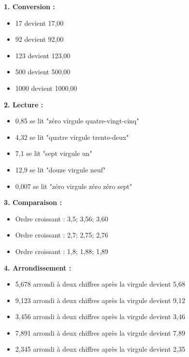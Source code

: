 \documentclass{article}
\begin{document}
\begin{tcolorbox}[colback=green!10!white, colframe=green!75!black, sharp corners=south, boxrule=0.8mm, title=Corrections]
    \textbf{1. Conversion :}
    \begin{itemize}
        \item 17 devient 17,00
        \item 92 devient 92,00
        \item 123 devient 123,00
        \item 500 devient 500,00
        \item 1000 devient 1000,00
    \end{itemize}

    \textbf{2. Lecture :}
    \begin{itemize}
        \item 0,85 se lit "zéro virgule quatre-vingt-cinq"
        \item 4,32 se lit "quatre virgule trente-deux"
        \item 7,1 se lit "sept virgule un"
        \item 12,9 se lit "douze virgule neuf"
        \item 0,007 se lit "zéro virgule zéro zéro sept"
    \end{itemize}

    \textbf{3. Comparaison :}
    \begin{itemize}
        \item Ordre croissant : 3,5; 3,56; 3,60
        \item Ordre croissant : 2,7; 2,75; 2,76
        \item Ordre croissant : 1,8; 1,88; 1,89
    \end{itemize}

    \textbf{4. Arrondissement :}
    \begin{itemize}
        \item 5,678 arrondi à deux chiffres après la virgule devient 5,68
        \item 9,123 arrondi à deux chiffres après la virgule devient 9,12
        \item 3,456 arrondi à deux chiffres après la virgule devient 3,46
        \item 7,891 arrondi à deux chiffres après la virgule devient 7,89
        \item 2,345 arrondi à deux chiffres après la virgule devient 2,35
    \end{itemize}


\end{tcolorbox}
\end{document}
